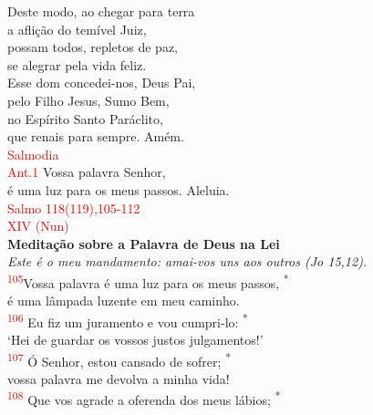 \documentclass{book}
\begin{document}
\begin{center}
    Deste modo, ao chegar para terra \\
    a aflição do temível Juiz, \\
    possam todos, repletos de paz, \\
    se alegrar pela vida feliz.
    \vspace{.2cm} \\
    Esse dom concedei-nos, Deus Pai, \\
    pelo Filho Jesus, Sumo Bem, \\
    no Espírito Santo Paráclito, \\
    que renais para sempre. Amém.
    \vspace{.2cm} \\
    \textcolor{red}{Salmodia}
    \vspace{.2cm} \\
    \textcolor{red}{Ant.1} Vossa palavra Senhor, \\
    é uma luz para os meus passos. Aleluia.
    \vspace{.2cm} \\
    \textcolor{red}{Salmo 118(119),105-112 \\ XIV (Nun)}
    \vspace{.2cm} \\
    \textbf{Meditação sobre a Palavra de Deus na Lei} \\
    \textit{Este é o meu mandamento: amai-vos uns aos outros (Jo 15,12).}
    \vspace{.2cm} \\
    \textsuperscript{\underline{\hspace{.07in}}\textcolor{red}{105}}Vossa palavra é uma luz para os meus passos, \textsuperscript{*} \\
    é uma lâmpada luzente em meu caminho. \\
    \textsuperscript{\underline{\hspace{.07in}}\textcolor{red}{106}} Eu fiz um juramento e vou cumpri-lo: \textsuperscript{*} \\
    `Hei de guardar os vossos justos julgamentos!'
    \vspace{.2cm} \\
    \textsuperscript{\underline{\hspace{.07in}}\textcolor{red}{107}} Ó Senhor, estou cansado de sofrer; \textsuperscript{*} \\
    vossa palavra me devolva a minha vida! \\
    \textsuperscript{\underline{\hspace{.07in}}\textcolor{red}{108}} Que vos agrade a oferenda dos meus lábios; \textsuperscript{*} \\

\end{center}
\end{document}
